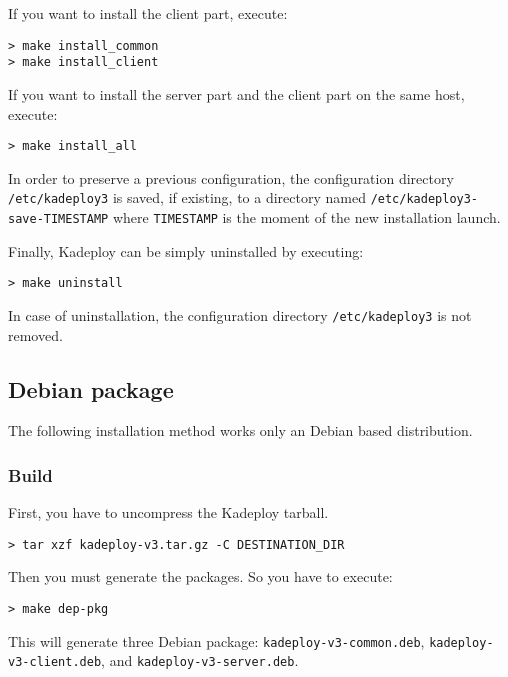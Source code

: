\documentclass[a4wide,10pt,oneside]{book}
\begin{document}
\noindent If you want to install the client part, execute:
\begin{small}
\begin{verbatim}
> make install_common
> make install_client
\end{verbatim}
\end{small}

\noindent If you want to install the server part and the client part on the same host, execute:
\begin{small}
\begin{verbatim}
> make install_all
\end{verbatim}
\end{small}

\noindent In order to preserve a previous configuration, the configuration directory \texttt{/etc/kadeploy3} is saved, if existing, to a directory named \texttt{/etc/kadeploy3-save-TIMESTAMP} where \texttt{TIMESTAMP} is the moment of the new installation launch.

\noindent Finally, Kadeploy can be simply uninstalled by executing:
\begin{small}
\begin{verbatim}
> make uninstall
\end{verbatim}
\end{small}

\noindent In case of uninstallation, the configuration directory \texttt{/etc/kadeploy3} is not removed.

\subsection{Debian package}
The following installation method works only an Debian based distribution.
\subsubsection{Build}
\noindent First, you have to uncompress the Kadeploy tarball. 
\begin{small}
\begin{verbatim}
> tar xzf kadeploy-v3.tar.gz -C DESTINATION_DIR
\end{verbatim}
\end{small}

\noindent Then you must generate the packages. So you have to execute:
\begin{small}
\begin{verbatim}
> make dep-pkg
\end{verbatim}
\end{small}
This will generate three Debian package: \texttt{kadeploy-v3-common.deb}, \texttt{kadeploy-v3-client.deb}, and \texttt{kadeploy-v3-server.deb}.
\end{document}
